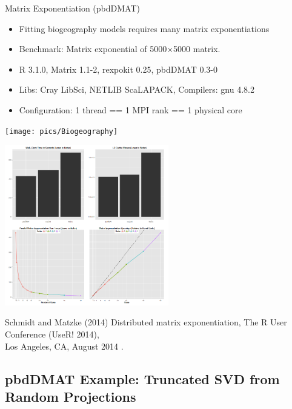 \begin{frame}
  \begin{block}{Matrix Exponentiation (pbdDMAT)}
    \begin{minipage}{5cm}
      \begin{itemize}\tiny
      \item Fitting biogeography models requires many matrix exponentiations
      \item Benchmark: Matrix exponential of 5000$\times$5000 matrix.
      \item R 3.1.0, Matrix 1.1-2, rexpokit 0.25, pbdDMAT 0.3-0
      \item Libs: Cray LibSci, NETLIB ScaLAPACK, Compilers: gnu 4.8.2
      \item Configuration: 1 thread == 1 MPI rank == 1 physical core
      \end{itemize}
      \vspace{-4ex}
      \begin{center}
        \texttt{[image: pics/Biogeography]}
      \end{center}
    \end{minipage}
    \begin{minipage}{6.9cm}
      \includegraphics[trim=1mm 1mm 1mm 1mm,clip=true,height=7cm]{pics/MatExp}
    \end{minipage}
  \end{block}
  \begin{raggedright}\tiny
    Schmidt and Matzke (2014) Distributed matrix exponentiation, The R
    User Conference (UseR! 2014), \\[-2ex] Los Angeles, CA, August 2014 .
  \end{raggedright}
\end{frame}

\subsection{pbdDMAT Example: Truncated SVD from Random Projections}
\makesubcontentsslidessec







%


